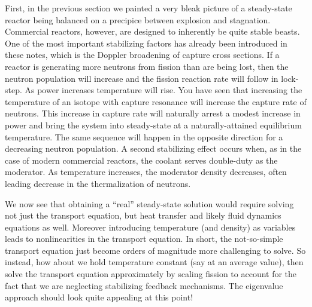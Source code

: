 \documentclass[11pt]{article}
\begin{document}
First, in the previous section we painted a very bleak picture of a steady-state reactor being balanced on a precipice between explosion and stagnation.  Commercial reactors, however, are designed to inherently be quite stable beasts.  One of the most important stabilizing factors has already been introduced in these notes, which is the Doppler broadening of capture cross sections.  If a reactor is generating more neutrons from fission than are being lost, then the neutron population will increase and the fission reaction rate will follow in lock-step.  As power increases temperature will rise.  You have seen that increasing the temperature of an isotope with capture resonance will increase the capture rate of neutrons.  This increase in capture rate will naturally arrest a modest increase in power and bring the system into steady-state at a naturally-attained equilibrium temperature.  The same sequence will happen in the opposite direction for a decreasing neutron population.  A second stabilizing effect occurs when, as in the case of modern commercial reactors, the coolant serves double-duty as the moderator.  As temperature increases, the moderator density decreases, often leading decrease in the thermalization of neutrons.

We now see that obtaining a ``real'' steady-state solution would require solving not just the transport equation, but heat transfer and likely fluid dynamics equations as well.  Moreover introducing temperature (and density) as variables leads to nonlinearities in the transport equation.  In short, the not-so-simple transport equation just become orders of magnitude more challenging to solve.  So instead, how about we hold temperature constant (say at an average value), then solve the transport equation approximately by scaling fission to account for the fact that we are neglecting stabilizing feedback mechanisms.  The eigenvalue approach should look quite appealing at this point!
\end{document}
